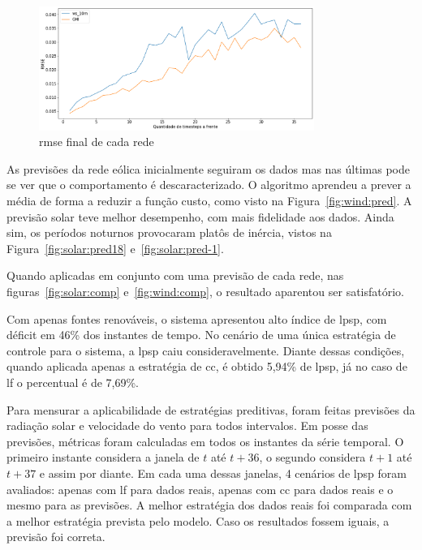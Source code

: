 \begin{figure}[ht]
	\centering
	\includegraphics[width=0.8\textwidth]{../img/rmse_last3m.png}
	\caption{\acrshort{rmse} final de cada rede}\label{fig:rmse}
\end{figure}

As previsões da rede eólica inicialmente seguiram os dados mas nas últimas pode
se ver que o comportamento é descaracterizado. O algoritmo aprendeu a prever a
média de forma a reduzir a função custo, como visto na
Figura~\ref{fig:wind:pred}.  A previsão solar teve melhor desempenho, com mais
fidelidade aos dados. Ainda sim, os períodos noturnos provocaram platôs de
inércia, vistos na Figura~\ref{fig:solar:pred18} e~\ref{fig:solar:pred-1}.





Quando aplicadas em conjunto com uma previsão de cada rede, nas
figuras~\ref{fig:solar:comp} e~\ref{fig:wind:comp},  o resultado aparentou
ser satisfatório.



Com apenas fontes renováveis, o sistema apresentou alto índice de \acrlong{lpsp},
com déficit em 46\% dos instantes de tempo. No cenário de uma única
estratégia de controle para o sistema, a \acrshort{lpsp} caiu consideravelmente.
Diante dessas condições, quando aplicada apenas a estratégia de \acrshort{cc}, é
obtido 5,94\% de \acrshort{lpsp}, já no caso de \acrshort{lf} o percentual é de
7,69\%.

Para mensurar a aplicabilidade de estratégias preditivas, foram feitas previsões
da radiação solar e velocidade do vento para todos intervalos. Em posse das
previsões, métricas foram calculadas em todos os instantes da série temporal.  O
primeiro instante considera a janela de $t$ até $t+36$, o segundo considera
$t+1$ até $t+37$ e assim por diante.  Em cada uma dessas janelas, 4 cenários de
\acrlong{lpsp} foram avaliados: apenas com \acrshort{lf} para dados reais,
apenas com \acrshort{cc} para dados reais e o mesmo para as previsões.  A melhor
estratégia dos dados reais foi comparada com a melhor estratégia prevista pelo
modelo. Caso os resultados fossem iguais, a previsão foi correta.

